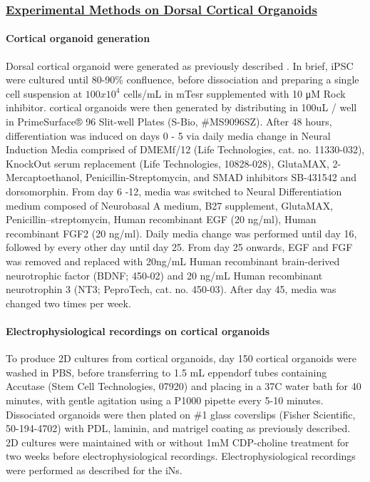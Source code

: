 \subsubsection{\underline{Experimental Methods on Dorsal Cortical Organoids}} 

\paragraph{Cortical organoid generation}
Dorsal cortical organoid were generated as previously described \cite{Sloan2018-ja}. In brief, iPSC were cultured until 80-90\% confluence, before dissociation and preparing a single cell suspension at $100 x 10^4$ cells/mL in mTesr supplemented with 10 μM Rock inhibitor. cortical organoids were then generated by distributing in 100uL / well in PrimeSurface® 96 Slit-well Plates (S-Bio, #MS9096SZ). After 48 hours, differentiation was induced on days 0 - 5 via daily media change in Neural Induction Media comprised of DMEMf/12 (Life Technologies, cat. no. 11330-032), KnockOut serum replacement (Life Technologies, 10828-028), GlutaMAX, 2-Mercaptoethanol, Penicillin-Streptomycin, and SMAD inhibitors SB-431542 and dorsomorphin. From day 6 -12, media was switched to Neural Differentiation medium composed of Neurobasal A medium, B27 supplement, GlutaMAX, Penicillin–streptomycin, Human recombinant EGF (20 ng/ml), Human recombinant FGF2 (20 ng/ml). Daily media change was performed until day 16, followed by every other day until day 25. From day 25 onwards, EGF and FGF was removed and replaced with 20ng/mL Human recombinant brain-derived neurotrophic factor (BDNF; 450-02) and 20 ng/mL Human recombinant neurotrophin 3 (NT3; PeproTech, cat. no. 450-03). After day 45, media was changed two times per week. 

\paragraph{Electrophysiological recordings on cortical organoids}
To produce 2D cultures from cortical organoids, day 150 cortical organoids were washed in PBS, before transferring to 1.5 mL eppendorf tubes containing Accutase (Stem Cell Technologies, 07920) and placing in a 37C water bath for 40 minutes, with gentle agitation using a P1000 pipette every 5-10 minutes. Dissociated organoids were then plated on \#1 glass coverslips (Fisher Scientific, 50-194-4702) with PDL, laminin, and matrigel coating as previously described. 2D cultures were maintained with or without 1mM CDP-choline treatment for two weeks before electrophysiological recordings. Electrophysiological recordings were performed as described for the iNs.

